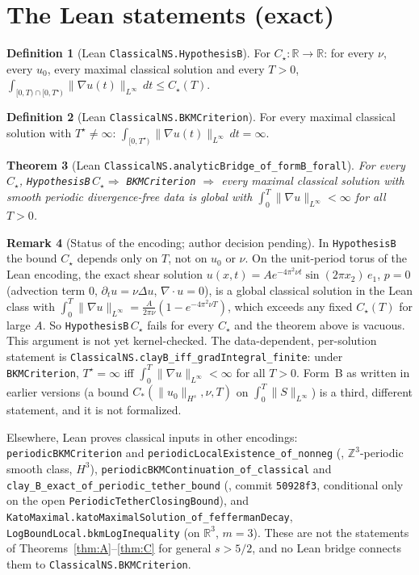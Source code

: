\documentclass[11pt,reqno]{amsart}
\newtheorem{theorem}{Theorem}[section]
\theoremstyle{definition}
\newtheorem{definition}[theorem]{Definition}
\newtheorem{remark}[theorem]{Remark}
\newcommand{\R}{\mathbb{R}}\newcommand{\T}{\mathbb{T}^3}\newcommand{\Z}{\mathbb{Z}}
\newcommand{\lean}[1]{\texttt{#1}}
\newcommand{\norm}[1]{\lVert #1\rVert}
\begin{document}
\section{The Lean statements (exact)}
\begin{definition}[Lean \lean{ClassicalNS.HypothesisB}]
For $C_\star:\R\to\R$: for every $\nu$, every $u_0$, every maximal classical solution and every $T>0$, $\int_{[0,T)\cap[0,T^\star)}\norm{\nabla u(t)}_{L^\infty}\,dt\le C_\star(T)$.
\end{definition}
\begin{definition}[Lean \lean{ClassicalNS.BKMCriterion}]
For every maximal classical solution with $T^\star\neq\infty$: $\int_{[0,T^\star)}\norm{\nabla u(t)}_{L^\infty}\,dt=\infty$.
\end{definition}
\begin{theorem}[Lean \lean{ClassicalNS.analyticBridge\_of\_formB\_forall}]
For every $C_\star$, \lean{HypothesisB}$\,C_\star\Rightarrow$ \lean{BKMCriterion} $\Rightarrow$ every maximal classical solution with smooth periodic divergence-free data is global with $\int_0^T\norm{\nabla u}_{L^\infty}<\infty$ for all $T>0$.
\end{theorem}
\begin{remark}[Status of the encoding; author decision pending]
In \lean{HypothesisB} the bound $C_\star$ depends only on $T$, not on $u_0$ or $\nu$. On the unit-period torus of the Lean encoding, the exact shear solution $u(x,t)=A e^{-4\pi^2\nu t}\sin(2\pi x_2)\,e_1$, $p=0$ (advection term $0$, $\partial_tu=\nu\Delta u$, $\nabla\cdot u=0$), is a global classical solution in the Lean class with $\int_0^T\norm{\nabla u}_{L^\infty}=\frac{A}{2\pi\nu}(1-e^{-4\pi^2\nu T})$, which exceeds any fixed $C_\star(T)$ for large $A$. So \lean{HypothesisB}$\,C_\star$ fails for every $C_\star$ and the theorem above is vacuous. This argument is not yet kernel-checked. The data-dependent, per-solution statement is \lean{ClassicalNS.clayB\_iff\_gradIntegral\_finite}: under \lean{BKMCriterion}, $T^\star=\infty$ iff $\int_0^T\norm{\nabla u}_{L^\infty}<\infty$ for all $T>0$. Form~B as written in earlier versions (a bound $C_*(\norm{u_0}_{H^s},\nu,T)$ on $\int_0^T\norm{S}_{L^\infty}$) is a third, different statement, and it is not formalized.
\end{remark}
\noindent Elsewhere, Lean proves classical inputs in other encodings: \lean{periodicBKMCriterion} and \lean{periodicLocalExistence\_of\_nonneg} (, $\Z^3$-periodic smooth class, $H^3$), \lean{periodicBKMContinuation\_of\_classical} and \lean{clay\_B\_exact\_of\_periodic\_tether\_bound} (, commit \texttt{50928f3}, conditional only on the open \lean{PeriodicTetherClosingBound}), and \lean{KatoMaximal.katoMaximalSolution\_of\_feffermanDecay}, \lean{LogBoundLocal.bkmLogInequality} (on $\R^3$, $m=3$). These are not the statements of Theorems~\ref{thm:A}--\ref{thm:C} for general $s>5/2$, and no Lean bridge connects them to \lean{ClassicalNS.BKMCriterion}.
\end{document}
